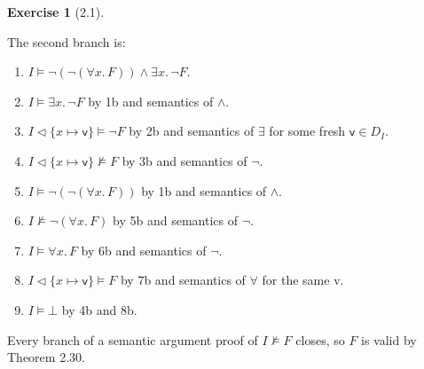 \documentclass[12pt, psamsfonts]{amsart}
\theoremstyle{definition}
\newtheorem*{exer}{Exercise}
\theoremstyle{remark}
\numberwithin{equation}{subsection}
\begin{document}
\begin{exer}[2.1]
\begin{enumerate}[label=(\alph*)]
            The second branch is:
            \begin{enumerate}[label=\arabic*b.]
                \item %
                    $I \models \neg(\neg(\forall x.\, F)) \land \exists x.\, \neg F$.
                \item %
                    $I \models \exists x.\, \neg F$ by 1b and semantics of $\land$.
                \item %
                    $I \vartriangleleft \{ x \mapsto \textsf{v} \} \models \neg F$ by 2b and semantics of $\exists$ for some fresh $\textsf{v} \in D_I$.
                \item %
                    $I \vartriangleleft \{ x \mapsto \textsf{v} \} \not\models F$ by 3b and semantics of $\neg$.
                \item %
                    $I \models \neg(\neg(\forall x.\, F))$ by 1b and semantics of $\land$.
                \item %
                    $I \not\models \neg(\forall x.\, F)$ by 5b and semantics of $\neg$.
                \item %
                    $I \models \forall x.\, F$ by 6b and semantics of $\neg$.
                \item %
                    $I \vartriangleleft \{ x \mapsto \textsf{v} \} \models F$ by 7b and semantics of $\forall$ for the same \textsf{v}.
                \item %
                    $I \models \bot$ by 4b and 8b.
            \end{enumerate}

            Every branch of a semantic argument proof of $I \not\models F$ closes, so $F$ is valid by Theorem 2.30.
    \end{enumerate}
\end{exer}
\end{document}
